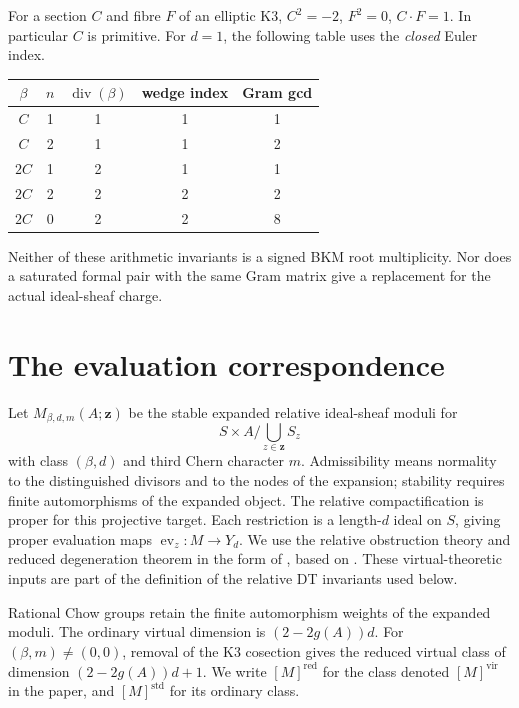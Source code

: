 For a section $C$ and fibre $F$ of an elliptic K3,
$C^2=-2$, $F^2=0$, $C\cdot F=1$. In particular $C$ is primitive.
For $d=1$, the following table uses the \emph{closed} Euler index.
\begin{center}
\begin{tabular}{ccccc}
\toprule
$\beta$ & $n$ & $\operatorname{div}(\beta)$ & wedge index & Gram gcd\\
\midrule
$C$ & 1 & 1 & 1 & 1\\
$C$ & 2 & 1 & 1 & 2\\
$2C$ & 1 & 2 & 1 & 1\\
$2C$ & 2 & 2 & 2 & 2\\
$2C$ & 0 & 2 & 2 & 8\\
\bottomrule
\end{tabular}
\end{center}
Neither of these arithmetic invariants is a signed BKM root
multiplicity. Nor does a saturated formal pair with the same Gram
matrix give a replacement for the actual ideal-sheaf charge.

\section{The evaluation correspondence}
\label{rdt:sec:kernel}

Let $M_{\beta,d,m}(A;\mathbf z)$ be the stable expanded relative
ideal-sheaf moduli for
\[
 S\times A\big/\bigcup_{z\in\mathbf z}S_z
\]
with class $(\beta,d)$ and third Chern character $m$.
Admissibility means normality to the distinguished divisors and to the
nodes of the expansion; stability requires finite automorphisms of the
expanded object. The relative compactification is proper for this
projective target. Each restriction is a length-$d$ ideal on $S$, giving
proper evaluation maps $\operatorname{ev}_z:M\to Y_d$.
We use the relative obstruction theory and reduced degeneration theorem
in the form of \cite[\S5.1]{OberdieckMC}, based on
\cite{LiWu,MaulikPandharipandeThomas}. These virtual-theoretic inputs are
part of the definition of the relative DT invariants used below.

Rational Chow groups retain the finite automorphism weights of the
expanded moduli. The ordinary virtual dimension is $(2-2g(A))d$.
For $(\beta,m)\ne(0,0)$, removal of the K3 cosection gives the
reduced virtual class of dimension $(2-2g(A))d+1$. We write
$[M]^\mathrm{red}$ for the class denoted $[M]^{\mathrm{vir}}$ in the paper,
and $[M]^\mathrm{std}$ for its ordinary class.

